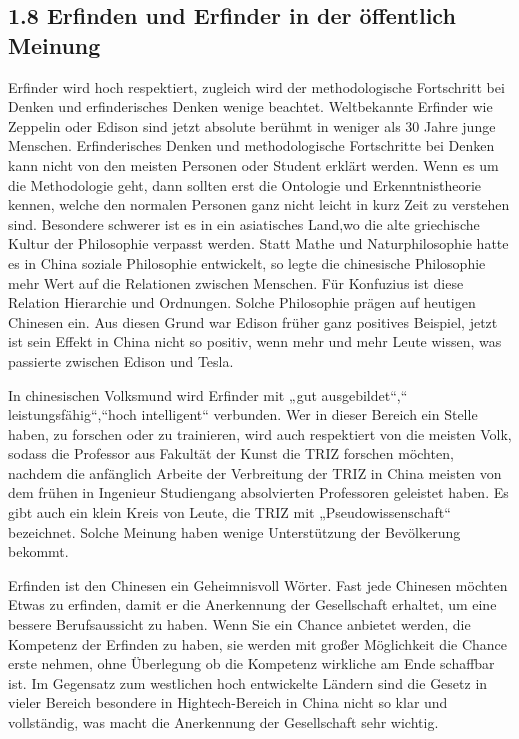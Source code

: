 \documentclass[11pt,a4paper]{article}
\begin{document}
\subsection{1.8 Erfinden und Erfinder in der öffentlich Meinung}

Erfinder wird hoch respektiert, zugleich wird der methodologische Fortschritt
bei Denken und erfinderisches Denken wenige beachtet. Weltbekannte Erfinder
wie Zeppelin oder Edison sind jetzt absolute berühmt in weniger als 30 Jahre
junge Menschen. Erfinderisches Denken und methodologische Fortschritte bei
Denken kann nicht von den meisten Personen oder Student erklärt werden. Wenn
es um die Methodologie geht, dann sollten erst die Ontologie und
Erkenntnistheorie kennen, welche den normalen Personen ganz nicht leicht in
kurz Zeit zu verstehen sind. Besondere schwerer ist es in ein asiatisches
Land,wo die alte griechische Kultur der Philosophie verpasst werden. Statt
Mathe und Naturphilosophie hatte es in China soziale Philosophie entwickelt,
so legte die chinesische Philosophie mehr Wert auf die Relationen zwischen
Menschen. Für Konfuzius ist diese Relation Hierarchie und Ordnungen. Solche
Philosophie prägen auf heutigen Chinesen ein. Aus diesen Grund war Edison
früher ganz positives Beispiel, jetzt ist sein Effekt in China nicht so
positiv, wenn mehr und mehr Leute wissen, was passierte zwischen Edison und
Tesla.

In chinesischen Volksmund wird Erfinder mit „gut ausgebildet“,“
leistungsfähig“,“hoch intelligent“ verbunden. Wer in dieser Bereich ein Stelle
haben, zu forschen oder zu trainieren, wird auch respektiert von die meisten
Volk, sodass die Professor aus Fakultät der Kunst die TRIZ forschen möchten,
nachdem die anfänglich Arbeite der Verbreitung der TRIZ in China  meisten von
dem frühen in Ingenieur Studiengang absolvierten Professoren geleistet
haben. Es gibt auch ein klein Kreis von Leute, die TRIZ mit
„Pseudowissenschaft“  bezeichnet.  Solche Meinung haben wenige Unterstützung
der Bevölkerung bekommt. 

Erfinden ist den Chinesen ein Geheimnisvoll Wörter. Fast jede Chinesen möchten
Etwas zu erfinden, damit er die Anerkennung der Gesellschaft erhaltet, um eine
bessere Berufsaussicht zu haben. Wenn Sie ein Chance anbietet werden, die
Kompetenz der Erfinden zu haben, sie werden mit großer Möglichkeit die Chance
erste nehmen, ohne Überlegung ob die Kompetenz wirkliche am Ende schaffbar
ist. Im Gegensatz zum westlichen hoch entwickelte Ländern sind die Gesetz in
vieler Bereich besondere in Hightech-Bereich in China nicht so klar und
vollständig, was macht die Anerkennung der Gesellschaft sehr wichtig. 
\end{document}
